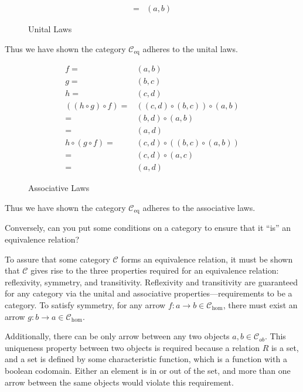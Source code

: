 \begin{proofitem}
\begin{figure}[H]
\begin{align*}
			=           & (a, b)
		\end{align*}
		\caption{Unital Laws}
	\end{figure}
	\item Thus we have shown the category $\mathcal{C}_{\text{eq}}$ adheres to the unital laws.
	\begin{figure}[H]
		\begin{align*}
			f=                               & (a, b)                        \\
			g=                               & (b, c)                        \\
			h=                               & (c, d)                        \\
			\left((h\circ g)\circ f\right) = & ((c,d)\circ(b,c))\circ (a, b) \\
			=                                & (b,d)\circ (a, b)             \\
			=                                & (a, d)                        \\
			h\circ (g\circ f)=               & (c, d)\circ((b,c)\circ(a,b))  \\
			=                                & (c, d)\circ(a,c)              \\
			=                                & (a, d)
		\end{align*}
		\caption{Associative Laws}
	\end{figure}
	\item Thus we have shown the category $\mathcal{C}_{\text{eq}}$ adheres to the
	associative laws.

	\setcounter{tttacounter}{0}
	\begin{ttta}
		Conversely, can you put some conditions on a category to ensure that it
		“is” an equivalence relation?
	\end{ttta}
	\item To assure that some category $\mathcal{C}$ forms an equivalence relation,
	it must be shown that $\mathcal{C}$ gives rise to the three properties
	required for an equivalence relation: reflexivity, symmetry, and
	transitivity. Reflexivity and transitivity are guaranteed for any category
	via the unital and associative properties---requirements to be a category. To
	satisfy symmetry, for any arrow $f:a\rightarrow b\in \mathcal{C}_{\hom}$, there
	must exist an arrow $g:b\rightarrow a\in \mathcal{C}_{\hom}$.

	Additionally, there can be only arrow between any two objects $a, b \in
		\mathcal{C}_{ob}$. This uniqueness property between two objects is required
	because a relation $R$ is a set, and a set is defined by some characteristic
	function, which is a function with a boolean codomain. Either an element is
	in or out of the set, and more than one arrow between the same objects would
	violate this requirement.
\end{proofitem}

